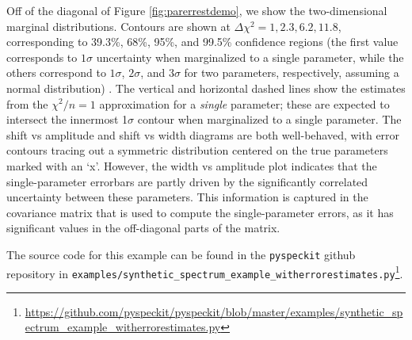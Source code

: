 \documentclass[twocolumn,linenumbers]{aastex63}
\newcommand{\pyspeckit}{\texttt{pyspeckit}\xspace}
\begin{document}
Off of the diagonal of Figure \ref{fig:parerrestdemo}, we show the
two-dimensional marginal distributions.  Contours
are shown at
$\Delta\chi^2=1,2.3,6.2,11.8$, corresponding to 39.3\%, 68\%, 95\%, and 99.5\%
confidence regions
(the first value corresponds to $1\sigma$ uncertainty when marginalized to a single parameter, while the others correspond to $1\sigma$, $2\sigma$, and
$3\sigma$ for two parameters, respectively, assuming a normal
distribution) .  The
vertical and horizontal dashed lines show the estimates from the $\chi^2/n=1$
approximation for a \emph{single} parameter; these are  expected to intersect
the innermost 1$\sigma$ contour  when marginalized to a single parameter. 
The shift vs amplitude and shift vs width diagrams are both well-behaved, with error
contours tracing out a symmetric distribution centered on the true parameters marked
with an `x'.
However, the width vs amplitude plot indicates that the single-parameter
errorbars %
are partly driven by the significantly correlated uncertainty between 
these parameters.
This information is captured in the covariance
matrix that is used to compute the single-parameter errors, as it has
significant values in the off-diagonal parts of the matrix.  

The source code for this example can be found in the \pyspeckit github
repository in \texttt{examples/synthetic\_spectrum\_example\_witherrorestimates.py}\footnote{\url{https://github.com/pyspeckit/pyspeckit/blob/master/examples/synthetic_spectrum_example_witherrorestimates.py}}.
\end{document}
